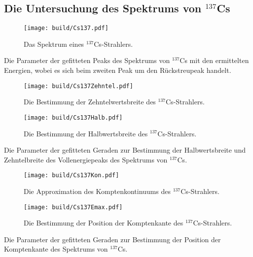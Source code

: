 \subsection{Die Untersuchung des Spektrums von $^{137}$Cs}
\begin{figure}
	\centering
	\texttt{[image: build/Cs137.pdf]}
	\caption{Das Spektrum eines $^{137}$Cs-Strahlers.}
	\label{fig:2}
\end{figure}
\begin{table}
	\centering
	\caption{Die Parameter der gefitteten Peaks des Spektrums von $^{137}$Cs mit den ermittelten Energien, wobei es sich beim zweiten Peak um den Rückstreupeak handelt.}
	
\end{table}
\begin{figure}
	\centering
	\texttt{[image: build/Cs137Zehntel.pdf]}
	\caption{Die Bestimmung der Zehntelwertsbreite des $^{137}$Cs-Strahlers.}
	\label{fig:10tel}
\end{figure}
\begin{figure}
	\centering
	\texttt{[image: build/Cs137Halb.pdf]}
	\caption{Die Bestimmung der Halbwertsbreite des $^{137}$Cs-Strahlers.}
	\label{fig:2tel}
\end{figure}
\begin{table}
	\centering
	\caption{Die Parameter der gefitteten Geraden zur Bestimmung der Halbwertsbreite und Zehntelbreite des Vollenergiepeaks des Spektrums von $^{137}$Cs.}
	
\end{table}
\begin{figure}
	\centering
	\texttt{[image: build/Cs137Kon.pdf]}
	\caption{Die Approximation des Komptenkontinuums des $^{137}$Cs-Strahlers.}
	\label{fig:Komptenkontinuums}
\end{figure}
\begin{figure}
	\centering
	\texttt{[image: build/Cs137Emax.pdf]}
	\caption{Die Bestimmung der Position der Komptenkante des $^{137}$Cs-Strahlers.}
	\label{fig:Emax}
\end{figure}
\begin{table}
	\centering
	\caption{Die Parameter der gefitteten Geraden zur Bestimmung der Position der Komptenkante des Spektrums von $^{137}$Cs.}
	
\end{table}
